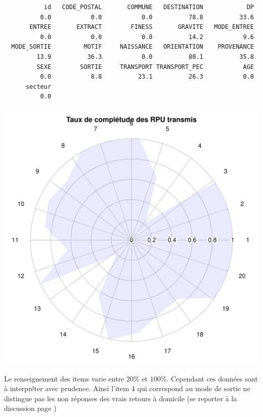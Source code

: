\documentclass[12pt,english,french,twoside]{book}\usepackage[]{graphicx}\usepackage[]{color}
\makeatletter
\def\maxwidth{ %
  \ifdim\Gin@nat@width>\linewidth
    \linewidth
  \else
    \Gin@nat@width
  \fi
}
\newenvironment{kframe}{%
 \def\at@end@of@kframe{}%
 \ifinner\ifhmode%
  \def\at@end@of@kframe{\end{minipage}}%
  \begin{minipage}{\columnwidth}%
 \fi\fi%
 \def\FrameCommand##1{\hskip\@totalleftmargin \hskip-\fboxsep
 \colorbox{shadecolor}{##1}\hskip-\fboxsep
     \hskip-\linewidth \hskip-\@totalleftmargin \hskip\columnwidth}%
 \MakeFramed {\advance\hsize-\width
   \@totalleftmargin\z@ \linewidth\hsize
   \@setminipage}}%
 {\par\unskip\endMakeFramed%
 \at@end@of@kframe}
\newenvironment{knitrout}{}{} %
\makeatother
\begin{document}
\begin{knitrout}
\color{fgcolor}\begin{kframe}
\begin{verbatim}
           id   CODE_POSTAL       COMMUNE   DESTINATION            DP 
          0.0           0.0           0.0          78.8          33.6 
       ENTREE       EXTRACT        FINESS       GRAVITE   MODE_ENTREE 
          0.0           0.0           0.0          14.2           9.6 
  MODE_SORTIE         MOTIF     NAISSANCE   ORIENTATION    PROVENANCE 
         13.9          36.3           0.0          80.1          35.8 
         SEXE        SORTIE     TRANSPORT TRANSPORT_PEC           AGE 
          0.0           8.8          23.1          26.3           0.0 
      secteur 
          0.0 
\end{verbatim}
\end{kframe}
\includegraphics[width=\maxwidth]{figure/radar} 

\end{knitrout}


Le renseignement des items varie entre $20\%$ et $100\%$. Cependant ces données sont à interpréter avec prudence. Ainsi l'item 4 qui correspond au mode de sortie ne distingue pas les non réponses des vrais retours à domicile (se reporter à la discussion page \pageref{ref:sortie})
\end{document}
